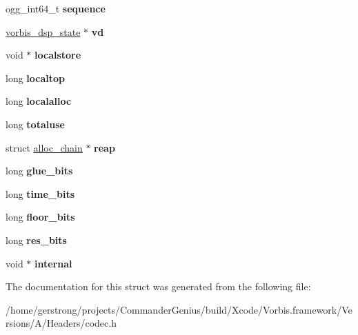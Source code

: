 \begin{DoxyCompactItemize}
\item 
\hypertarget{structvorbis__block_a09e48c70ae79cae2d37a4e0e55f294ef}{
ogg\_\-int64\_\-t {\bfseries sequence}}
\label{structvorbis__block_a09e48c70ae79cae2d37a4e0e55f294ef}

\item 
\hypertarget{structvorbis__block_adefe79be61ef3631c18cd7b8afae31a2}{
\hyperlink{structvorbis__dsp__state}{vorbis\_\-dsp\_\-state} $\ast$ {\bfseries vd}}
\label{structvorbis__block_adefe79be61ef3631c18cd7b8afae31a2}

\item 
\hypertarget{structvorbis__block_a457093b574de4317ae1b2505a868a5fb}{
void $\ast$ {\bfseries localstore}}
\label{structvorbis__block_a457093b574de4317ae1b2505a868a5fb}

\item 
\hypertarget{structvorbis__block_a5d207139360d9fa6c825ebca553ae984}{
long {\bfseries localtop}}
\label{structvorbis__block_a5d207139360d9fa6c825ebca553ae984}

\item 
\hypertarget{structvorbis__block_a0bf878ef26f578abfd5c7974d8a09f7d}{
long {\bfseries localalloc}}
\label{structvorbis__block_a0bf878ef26f578abfd5c7974d8a09f7d}

\item 
\hypertarget{structvorbis__block_a24008023c086b4a0eb8b72761cfcf338}{
long {\bfseries totaluse}}
\label{structvorbis__block_a24008023c086b4a0eb8b72761cfcf338}

\item 
\hypertarget{structvorbis__block_a047afc2ab3e3936d86817ff45c0eecde}{
struct \hyperlink{structalloc__chain}{alloc\_\-chain} $\ast$ {\bfseries reap}}
\label{structvorbis__block_a047afc2ab3e3936d86817ff45c0eecde}

\item 
\hypertarget{structvorbis__block_ae1456c556d8365c41ec816956759074b}{
long {\bfseries glue\_\-bits}}
\label{structvorbis__block_ae1456c556d8365c41ec816956759074b}

\item 
\hypertarget{structvorbis__block_ab92eba2cf1a653478630617ddad97f88}{
long {\bfseries time\_\-bits}}
\label{structvorbis__block_ab92eba2cf1a653478630617ddad97f88}

\item 
\hypertarget{structvorbis__block_ac96102ac7115856ff07be7cebeb6de37}{
long {\bfseries floor\_\-bits}}
\label{structvorbis__block_ac96102ac7115856ff07be7cebeb6de37}

\item 
\hypertarget{structvorbis__block_a3c91d73c477db77f4b85ded0fdcb607c}{
long {\bfseries res\_\-bits}}
\label{structvorbis__block_a3c91d73c477db77f4b85ded0fdcb607c}

\item 
\hypertarget{structvorbis__block_ab506fee4272b6e8c634516c1cbb1e638}{
void $\ast$ {\bfseries internal}}
\label{structvorbis__block_ab506fee4272b6e8c634516c1cbb1e638}

\end{DoxyCompactItemize}


The documentation for this struct was generated from the following file:\begin{DoxyCompactItemize}
\item 
/home/gerstrong/projects/CommanderGenius/build/Xcode/Vorbis.framework/Versions/A/Headers/codec.h\end{DoxyCompactItemize}
